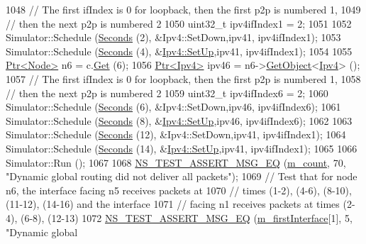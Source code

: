 \begin{DoxyCode}
1048   \textcolor{comment}{// The first ifIndex is 0 for loopback, then the first p2p is numbered 1,}
1049   \textcolor{comment}{// then the next p2p is numbered 2}
1050   uint32\_t ipv4ifIndex1 = 2;
1051 
1052   Simulator::Schedule (\hyperlink{group__timecivil_ga33c34b816f8ff6628e33d5c8e9713b9e}{Seconds} (2), &Ipv4::SetDown,ipv41, ipv4ifIndex1);
1053   Simulator::Schedule (\hyperlink{group__timecivil_ga33c34b816f8ff6628e33d5c8e9713b9e}{Seconds} (4), &\hyperlink{tap-device-creator_8cc_ab1a65327983ffdcbff3023b6fed670b9}{Ipv4::SetUp},ipv41, ipv4ifIndex1);
1054 
1055   \hyperlink{classns3_1_1Ptr}{Ptr<Node>} n6 = c.\hyperlink{classns3_1_1NodeContainer_a9ed96e2ecc22e0f5a3d4842eb9bf90bf}{Get} (6);
1056   \hyperlink{classns3_1_1Ptr}{Ptr<Ipv4>} ipv46 = n6->\hyperlink{classns3_1_1Object_a13e18c00017096c8381eb651d5bd0783}{GetObject}<\hyperlink{classns3_1_1Ipv4}{Ipv4}> ();
1057   \textcolor{comment}{// The first ifIndex is 0 for loopback, then the first p2p is numbered 1,}
1058   \textcolor{comment}{// then the next p2p is numbered 2}
1059   uint32\_t ipv4ifIndex6 = 2;
1060   Simulator::Schedule (\hyperlink{group__timecivil_ga33c34b816f8ff6628e33d5c8e9713b9e}{Seconds} (6), &Ipv4::SetDown,ipv46, ipv4ifIndex6);
1061   Simulator::Schedule (\hyperlink{group__timecivil_ga33c34b816f8ff6628e33d5c8e9713b9e}{Seconds} (8), &\hyperlink{tap-device-creator_8cc_ab1a65327983ffdcbff3023b6fed670b9}{Ipv4::SetUp},ipv46, ipv4ifIndex6);
1062 
1063   Simulator::Schedule (\hyperlink{group__timecivil_ga33c34b816f8ff6628e33d5c8e9713b9e}{Seconds} (12), &Ipv4::SetDown,ipv41, ipv4ifIndex1);
1064   Simulator::Schedule (\hyperlink{group__timecivil_ga33c34b816f8ff6628e33d5c8e9713b9e}{Seconds} (14), &\hyperlink{tap-device-creator_8cc_ab1a65327983ffdcbff3023b6fed670b9}{Ipv4::SetUp},ipv41, ipv4ifIndex1);
1065 
1066   Simulator::Run ();
1067 
1068   \hyperlink{group__testing_ga2a9d78cffb3db8e867c35fff0b698cf5}{NS\_TEST\_ASSERT\_MSG\_EQ} (\hyperlink{classIpv4DynamicGlobalRoutingTestCase_a92ca312da11a0ad225fb2175c6efe639}{m\_count}, 70, \textcolor{stringliteral}{"Dynamic global routing did not deliver
       all packets"});
1069 \textcolor{comment}{// Test that for node n6, the interface facing n5 receives packets at}
1070 \textcolor{comment}{// times (1-2), (4-6), (8-10), (11-12), (14-16) and the interface}
1071 \textcolor{comment}{// facing n1 receives packets at times (2-4), (6-8), (12-13)}
1072   \hyperlink{group__testing_ga2a9d78cffb3db8e867c35fff0b698cf5}{NS\_TEST\_ASSERT\_MSG\_EQ} (\hyperlink{classIpv4DynamicGlobalRoutingTestCase_ac0a40f532a0ce5c35d25681227e9cee1}{m\_firstInterface}[1], 5, \textcolor{stringliteral}{"Dynamic global
}
\end{DoxyCode}

